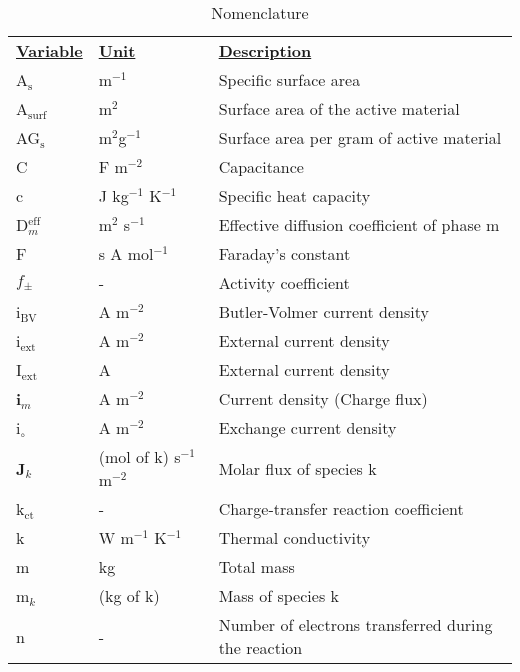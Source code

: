 \documentclass[12pt]{article}
\begin{document}
\begin{table}[]
	\caption{Nomenclature}
	\centering
	\begin{tabular}{lll}
		\textbf{\underline{Variable}}  & \textbf{\underline{Unit}} & \textbf{\underline{Description}} \\
		A$_\text{s}$   		& m$^{-1}$     				& Specific surface area            \\
		A$_\text{surf}$		& m$^{2}$     				& Surface area of the active material            \\
		AG$_\text{s}$  		& m$^{2}$g$^{-1}$			& Surface area per gram of active material            \\
		C         		 	& F m$^{-2}$      			& Capacitance            \\
		c         		 	& J kg$^{-1}$ K$^{-1}$		& Specific heat capacity            \\
		D$_m^{\text{eff}}$	& m$^2$ s$^{-1}$     		& Effective diffusion coefficient of phase m            \\
		F         			& s A mol$^{-1}$   			& Faraday's constant            \\
		$f_\pm$       		& -     					& Activity coefficient            \\
		i$_\textrm{BV}$ 	& A m$^{-2}$    			& Butler-Volmer current density            \\
		i$_\textrm{ext}$	& A m$^{-2}$     			& External current density            \\
		I$_\textrm{ext}$	& A 		     			& External current density            \\
		\textbf{i}$_m$  	& A m$^{-2}$     			& Current density (Charge flux)            \\
		i$_\circ$       	& A m$^{-2}$     			& Exchange current density            \\
		\textbf{J}$_k$  	& (mol of k) s$^{-1}$ m$^{-2}$ & Molar flux of species k            \\
		k$_\textrm{ct}$ 	& -    						& Charge-transfer reaction coefficient            \\
		k				 	& W m$^{-1}$ K$^{-1}$		& Thermal conductivity            \\
		m         			& kg     					& Total mass            \\
		m$_k$        		& (kg of k)    				& Mass of species k            \\
		n         			& -     					& Number of electrons transferred during the reaction            \\

\end{tabular}
\end{table}
\end{document}
